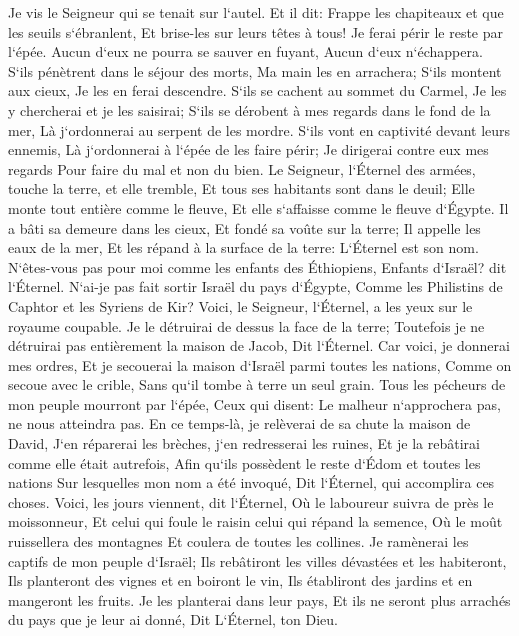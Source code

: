 \verse Je vis le Seigneur qui se tenait sur l`autel. Et il dit: Frappe les chapiteaux et que les seuils s`ébranlent, Et brise-les sur leurs têtes à tous! Je ferai périr le reste par l`épée. Aucun d`eux ne pourra se sauver en fuyant, Aucun d`eux n`échappera. 
\verse S`ils pénètrent dans le séjour des morts, Ma main les en arrachera; S`ils montent aux cieux, Je les en ferai descendre. 
\verse S`ils se cachent au sommet du Carmel, Je les y chercherai et je les saisirai; S`ils se dérobent à mes regards dans le fond de la mer, Là j`ordonnerai au serpent de les mordre. 
\verse S`ils vont en captivité devant leurs ennemis, Là j`ordonnerai à l`épée de les faire périr; Je dirigerai contre eux mes regards Pour faire du mal et non du bien. 
\verse Le Seigneur, l`Éternel des armées, touche la terre, et elle tremble, Et tous ses habitants sont dans le deuil; Elle monte tout entière comme le fleuve, Et elle s`affaisse comme le fleuve d`Égypte. 
\verse Il a bâti sa demeure dans les cieux, Et fondé sa voûte sur la terre; Il appelle les eaux de la mer, Et les répand à la surface de la terre: L`Éternel est son nom. 
\verse N`êtes-vous pas pour moi comme les enfants des Éthiopiens, Enfants d`Israël? dit l`Éternel. N`ai-je pas fait sortir Israël du pays d`Égypte, Comme les Philistins de Caphtor et les Syriens de Kir? 
\verse Voici, le Seigneur, l`Éternel, a les yeux sur le royaume coupable. Je le détruirai de dessus la face de la terre; Toutefois je ne détruirai pas entièrement la maison de Jacob, Dit l`Éternel. 
\verse Car voici, je donnerai mes ordres, Et je secouerai la maison d`Israël parmi toutes les nations, Comme on secoue avec le crible, Sans qu`il tombe à terre un seul grain. 
\verse Tous les pécheurs de mon peuple mourront par l`épée, Ceux qui disent: Le malheur n`approchera pas, ne nous atteindra pas. 
\verse En ce temps-là, je relèverai de sa chute la maison de David, J`en réparerai les brèches, j`en redresserai les ruines, Et je la rebâtirai comme elle était autrefois, 
\verse Afin qu`ils possèdent le reste d`Édom et toutes les nations Sur lesquelles mon nom a été invoqué, Dit l`Éternel, qui accomplira ces choses. 
\verse Voici, les jours viennent, dit l`Éternel, Où le laboureur suivra de près le moissonneur, Et celui qui foule le raisin celui qui répand la semence, Où le moût ruissellera des montagnes Et coulera de toutes les collines. 
\verse Je ramènerai les captifs de mon peuple d`Israël; Ils rebâtiront les villes dévastées et les habiteront, Ils planteront des vignes et en boiront le vin, Ils établiront des jardins et en mangeront les fruits. 
\verse Je les planterai dans leur pays, Et ils ne seront plus arrachés du pays que je leur ai donné, Dit L`Éternel, ton Dieu. 

